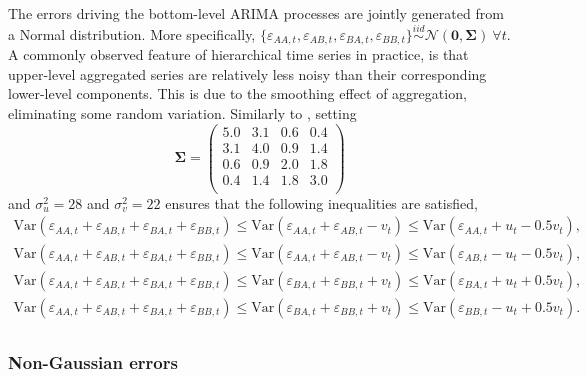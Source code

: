 \documentclass[12pt]{article}
\def\var{\text{Var}}
\theoremstyle{definition}
\begin{document}
The errors driving the bottom-level ARIMA processes are jointly generated from a Normal distribution. More specifically, $\{\varepsilon_{AA,t},\varepsilon_{AB,t},\varepsilon_{BA,t},\varepsilon_{BB,t}\} \overset{iid}{\sim} \mathcal{N}(\bm{0}, \bm{\Sigma})~\forall t$. A commonly observed feature of hierarchical time series in practice, is that upper-level aggregated series are relatively less noisy than their corresponding lower-level components. This is due to the smoothing effect of aggregation, eliminating some random variation. Similarly to \cite{WicEtAl2019}, setting
\begin{equation*}\label{eq:SigmaGaussian}
\bm{\Sigma} =
\begin{pmatrix}
5.0 & 3.1 & 0.6 & 0.4 \\
3.1 & 4.0 & 0.9 & 1.4 \\
0.6 & 0.9 & 2.0 & 1.8 \\
0.4 & 1.4 & 1.8 & 3.0 \\
\end{pmatrix}
\end{equation*} and $\sigma^2_u=28$ and $\sigma^2_v=22$ ensures that the following inequalities are satisfied,
\begin{align*}
\var(\varepsilon_{AA,t} + \varepsilon_{AB,t} + \varepsilon_{BA,t} + \varepsilon_{BB,t})
\le \var(\varepsilon_{AA,t}+\varepsilon_{AB,t}-v_t)
\le \var(\varepsilon_{AA,t}+u_t-0.5v_t),\\
\var(\varepsilon_{AA,t} + \varepsilon_{AB,t} + \varepsilon_{BA,t} + \varepsilon_{BB,t})
\le \var(\varepsilon_{AA,t}+\varepsilon_{AB,t}-v_t)
\le \var(\varepsilon_{AB,t}-u_t-0.5v_t),\\
\var(\varepsilon_{AA,t} + \varepsilon_{AB,t} + \varepsilon_{BA,t} + \varepsilon_{BB,t})
\le \var(\varepsilon_{BA,t}+\varepsilon_{BB,t}+v_t)
\le \var(\varepsilon_{BA,t}+u_t+0.5v_t),\\
\var(\varepsilon_{AA,t} + \varepsilon_{AB,t} + \varepsilon_{BA,t} + \varepsilon_{BB,t})
\le \var(\varepsilon_{BA,t}+\varepsilon_{BB,t}+v_t)
\le \var(\varepsilon_{BB,t}-u_t+0.5v_t).\\
\end{align*}


\subsubsection*{Non-Gaussian errors}
\end{document}
